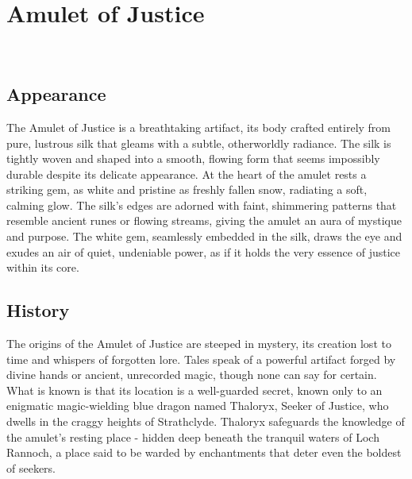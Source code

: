 \ItemCategory{}
\ItemSubCategory{}
\ItemFolder{}

\chapter*{Amulet of Justice}
\\

%
	
\section*{Appearance}
{\entryfont The Amulet of Justice is a breathtaking artifact, its body crafted entirely from pure, lustrous silk that gleams with a subtle, otherworldly radiance. The silk is tightly woven and shaped into a smooth, flowing form that seems impossibly durable despite its delicate appearance. At the heart of the amulet rests a striking gem, as white and pristine as freshly fallen snow, radiating a soft, calming glow. The silk's edges are adorned with faint, shimmering patterns that resemble ancient runes or flowing streams, giving the amulet an aura of mystique and purpose. The white gem, seamlessly embedded in the silk, draws the eye and exudes an air of quiet, undeniable power, as if it holds the very essence of justice within its core.}

\section*{History}
{\entryfont The origins of the Amulet of Justice are steeped in mystery, its creation lost to time and whispers of forgotten lore. Tales speak of a powerful artifact forged by divine hands or ancient, unrecorded magic, though none can say for certain. What is known is that its location is a well-guarded secret, known only to an enigmatic magic-wielding blue dragon named Thaloryx, Seeker of Justice, who dwells in the craggy heights of Strathclyde. Thaloryx safeguards the knowledge of the amulet's resting place - hidden deep beneath the tranquil waters of Loch Rannoch, a place said to be warded by enchantments that deter even the boldest of seekers.}

